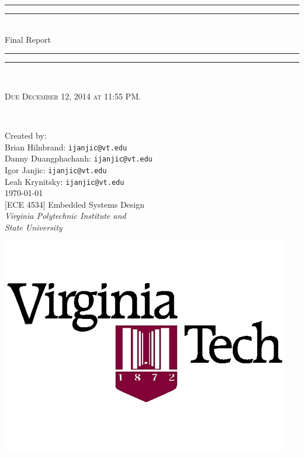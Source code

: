 
\begin{titlepage}

\centering
\vspace*{\baselineskip}

\rule{\textwidth}{1.6pt}\vspace*{-\baselineskip}\vspace*{2pt}
\rule{\textwidth}{0.4pt}\\[\baselineskip]

{\LARGE Final Report\\[0.3\baselineskip]}

\rule{\textwidth}{0.4pt}\vspace*{-\baselineskip}\vspace{3.2pt}
\rule{\textwidth}{1.6pt}\\[\baselineskip]

\wl

\scshape Due December 12, 2014 at 11:55 PM.
{\small 
\\[\baselineskip]\par}

\vfill

Created by:\\[0.2\baselineskip]
{Brian Hilnbrand:     \texttt{ijanjic@vt.edu}}\\[0.2\baselineskip]
{Danny Duangphachanh: \texttt{ijanjic@vt.edu}}\\[0.2\baselineskip]
{Igor Janjic:         \texttt{ijanjic@vt.edu}}\\[0.2\baselineskip]
{Leah Krynitsky:      \texttt{ijanjic@vt.edu}}\\[0.4\baselineskip]
{\small \today}\\[0.8\baselineskip]
{\small [ECE 4534] Embedded Systems Design}\\[0.2\baselineskip]
{\small\itshape Virginia Polytechnic Institute and\\ State University}\\[0.2\baselineskip]

\begin{center}
	\includegraphics[scale=0.35]{Images/Logo}
\end{center}

\end{titlepage}
